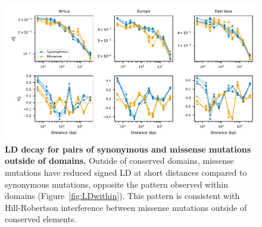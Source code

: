 \documentclass[]{article}
\begin{document}
\begin{figure}[ht!]
    \centering
    \includegraphics{../figures/ld_decay_outside_domains}
    \caption{
        \textbf{LD decay for pairs of synonymous and missense mutations
        outside of domains.}
        Outside of conserved domains,
        missense mutations have reduced signed LD at short distances
        compared to synonymous mutations,
        opposite the pattern observed within domains (Figure~\ref{fig:LDwithin}).
        This pattern is consistent with Hill-Robertson interference between
        missense mutations outside of conserved elements.
    }
    \label{fig:LDoutside}
\end{figure}
\end{document}
